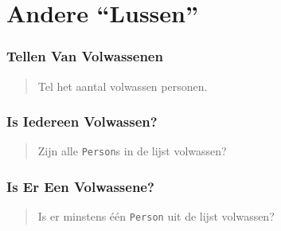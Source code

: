 \section{Andere ``Lussen''}

\frame{\tableofcontents[currentsection]}

\begin{frame}
  \frametitle{Tellen Van Volwassenen}
  \begin{quote}
    Tel het aantal volwassen personen.
  \end{quote}
  \vskip5mm
  \begin{overprint}

  \end{overprint}
\end{frame}

\begin{frame}
  \frametitle{Is Iedereen Volwassen?}
  \begin{quote}
    Zijn alle \texttt{Person}s in de lijst volwassen?
  \end{quote}
  \vskip5mm
  \begin{overprint}

  \end{overprint}
\end{frame}

\begin{frame}
  \frametitle{Is Er Een Volwassene?}
  \begin{quote}
    Is er minstens \'e\'en \texttt{Person} uit de lijst volwassen?
  \end{quote}
  \vskip5mm
  \begin{overprint}

  \end{overprint}
\end{frame}
